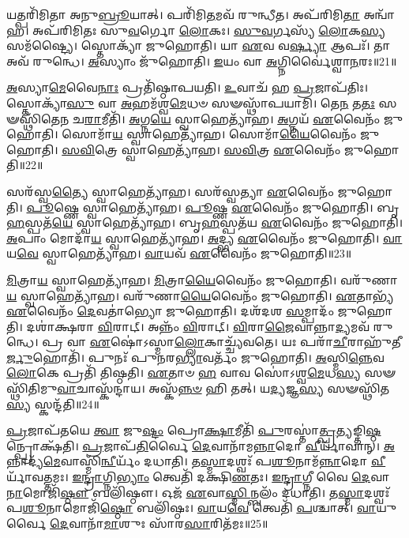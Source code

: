 𑌯𑌤𑍍𑌪𑌰𑌿᳴𑌮𑌿𑌤𑌾 𑌅𑌨𑍁\-\ul{𑌬𑍍𑌰𑍂}\-𑌯𑌾𑌤𑍍।
𑌪𑌰𑌿᳴𑌮𑌿\-\ul{𑌤}\-𑌮𑌵᳴ 𑌰𑍁𑌨𑍍𑌧𑍀𑌤।
𑌅𑌪᳴𑌰𑌿𑌮𑌿\-\ul{𑌤𑌾} 𑌅𑌨𑍍𑌵𑌾᳴𑌹।
𑌅𑌪᳴𑌰𑌿𑌮𑌿𑌤𑌃 𑌸𑍁\-\ul{𑌵}\-𑌰𑍍𑌗𑍋 \ul{𑌲𑍋}\-𑌕𑌃।
\-\ul{𑌸𑍁}\-\-\ul{𑌵}\-𑌰𑍍𑌗𑌸𑍍𑌯᳴ \ul{𑌲𑍋}\-𑌕\-\ul{𑌸𑍍𑌯} 𑌸𑌮᳴𑌷𑍍𑌟𑍍𑌯𑍈।
𑌸𑍍𑌤𑍋𑌕𑍍𑌯𑌾᳴ 𑌜𑍁𑌹𑍋𑌤𑌿।
𑌯𑌾 \ul{𑌏}\-𑌵 𑌵\-\ul{𑌰𑍍𑌷𑍍𑌯𑌾} 𑌆𑌪𑌃᳴।
𑌤𑌾 𑌅𑌵᳴ 𑌰𑍁𑌨𑍍𑌧𑍇।
\-\ul{𑌅}\-𑌸𑍍𑌯𑌾𑌂 𑌜𑍁᳴𑌹𑍋𑌤𑌿।
\-\ul{𑌇}\-𑌯𑌂 𑌵𑌾 \ul{𑌅}\-𑌗𑍍𑌨𑌿𑌰𑍍𑌵𑍈॑𑌶𑍍𑌵𑌾\-\ul{𑌨}\-𑌰𑌃॥21॥

\-\ul{𑌅}\-𑌸𑍍𑌯𑌾\-\ul{𑌮𑍇}\-𑌵𑍈\-\ul{𑌨𑌾𑌃} 𑌪𑍍𑌰𑌤𑌿᳴\-𑌷𑍍𑌠𑌾𑌪𑌯𑌤𑌿।
\-\ul{𑌉}\-𑌵𑌾𑌚᳴ 𑌹 \ul{𑌪𑍍𑌰}\-𑌜𑌾\-𑌪᳴𑌤𑌿𑌃।
𑌸𑍍𑌤𑍋𑌕𑍍𑌯𑌾᳴\-\ul{𑌸𑍁} 𑌵𑌾 \ul{𑌅}\-𑌹𑌮᳴𑌶𑍍𑌵\-\ul{𑌮𑍇}\-𑌧𑍞 𑌸𑍟𑌸𑍍𑌥𑌾᳴𑌪𑌯𑌾𑌮𑌿।
𑌤𑍇\-\ul{𑌨} 𑌤\-\ul{𑌤𑌃} 𑌸𑍟𑌸𑍍𑌥𑌿᳴𑌤𑍇𑌨 𑌚\-\ul{𑌰𑌾}\-𑌮𑍀𑌤𑌿᳴।
\-\ul{𑌅}\-𑌗𑍍𑌨\-\ul{𑌯𑍇} 𑌸𑍍𑌵𑌾𑌹𑍇𑌤𑍍𑌯𑌾᳴𑌹।
\-\ul{𑌅}\-𑌗𑍍𑌨𑌯᳴ \ul{𑌏}\-𑌵𑍈𑌨𑌂᳴ 𑌜𑍁𑌹𑍋𑌤𑌿।
𑌸𑍋𑌮𑌾᳴\-\ul{𑌯} 𑌸𑍍𑌵𑌾𑌹𑍇𑌤𑍍𑌯𑌾᳴𑌹।
𑌸𑍋𑌮𑌾᳴\-\ul{𑌯𑍈}\-𑌵𑍈𑌨𑌂᳴ 𑌜𑍁𑌹𑍋𑌤𑌿।
\-\ul{𑌸}\-\-\ul{𑌵𑌿}\-𑌤𑍍𑌰𑍇 𑌸𑍍𑌵𑌾𑌹𑍇𑌤𑍍𑌯𑌾᳴𑌹।
\-\ul{𑌸}\-\-\ul{𑌵𑌿}\-𑌤𑍍𑌰 \ul{𑌏}\-𑌵𑍈𑌨𑌂᳴ 𑌜𑍁𑌹𑍋𑌤𑌿॥22॥

𑌸𑌰᳴𑌸𑍍𑌵\-\ul{𑌤𑍍𑌯𑍈} 𑌸𑍍𑌵𑌾𑌹𑍇𑌤𑍍𑌯𑌾᳴𑌹।
𑌸𑌰᳴𑌸𑍍𑌵𑌤𑍍𑌯𑌾 \ul{𑌏}\-𑌵𑍈𑌨𑌂᳴ 𑌜𑍁𑌹𑍋𑌤𑌿।
\-\ul{𑌪𑍂}\-𑌷𑍍𑌣𑍇 𑌸𑍍𑌵𑌾𑌹𑍇𑌤𑍍𑌯𑌾᳴𑌹।
\-\ul{𑌪𑍂}\-𑌷𑍍𑌣 \ul{𑌏}\-𑌵𑍈𑌨𑌂᳴ 𑌜𑍁𑌹𑍋𑌤𑌿।
𑌬𑍃\-\ul{𑌹}\-𑌸𑍍𑌪𑌤᳴\-\ul{𑌯𑍇} 𑌸𑍍𑌵𑌾𑌹𑍇𑌤𑍍𑌯𑌾᳴𑌹।
𑌬𑍃\-\ul{𑌹}\-𑌸𑍍𑌪𑌤᳴𑌯 \ul{𑌏}\-𑌵𑍈𑌨𑌂᳴ 𑌜𑍁𑌹𑍋𑌤𑌿।
\-\ul{𑌅}\-𑌪𑌾𑌂 𑌮𑍋𑌦𑌾᳴\-\ul{𑌯} 𑌸𑍍𑌵𑌾𑌹𑍇𑌤𑍍𑌯𑌾᳴𑌹।
\-\ul{𑌅}\-𑌦𑍍𑌭𑍍𑌯 \ul{𑌏}\-𑌵𑍈𑌨𑌂᳴ 𑌜𑍁𑌹𑍋𑌤𑌿।
\-\ul{𑌵𑌾}\-𑌯\-\ul{𑌵𑍇} 𑌸𑍍𑌵𑌾𑌹𑍇𑌤𑍍𑌯𑌾᳴𑌹।
\-\ul{𑌵𑌾}\-𑌯𑌵᳴ \ul{𑌏}\-𑌵𑍈𑌨𑌂᳴ 𑌜𑍁𑌹𑍋𑌤𑌿॥23॥

\-\ul{𑌮𑌿}\-𑌤𑍍𑌰𑌾\-\ul{𑌯} 𑌸𑍍𑌵𑌾𑌹𑍇𑌤𑍍𑌯𑌾᳴𑌹।
\-\ul{𑌮𑌿}\-𑌤𑍍𑌰𑌾\-\ul{𑌯𑍈}\-𑌵𑍈𑌨𑌂᳴ 𑌜𑍁𑌹𑍋𑌤𑌿।
𑌵𑌰𑍁᳴𑌣𑌾\-\ul{𑌯} 𑌸𑍍𑌵𑌾𑌹𑍇𑌤𑍍𑌯𑌾᳴𑌹।
𑌵𑌰𑍁᳴𑌣𑌾\-\ul{𑌯𑍈}\-𑌵𑍈𑌨𑌂᳴ 𑌜𑍁𑌹𑍋𑌤𑌿।
\-\ul{𑌏}\-𑌤𑌾𑌭𑍍𑌯᳴ \ul{𑌏}\-𑌵𑍈𑌨𑌂᳴ \ul{𑌦𑍇}\-𑌵𑌤𑌾॑𑌭𑍍𑌯𑍋 𑌜𑍁𑌹𑍋𑌤𑌿।
𑌦𑌶᳴𑌦𑌶 \ul{𑌸}\-𑌮𑍍𑌪𑌾𑌦𑌂᳴ 𑌜𑍁𑌹𑍋𑌤𑌿।
𑌦𑌶𑌾॑𑌕𑍍𑌷𑌰𑌾 \ul{𑌵𑌿}\-𑌰𑌾𑌟𑍍।
𑌅𑌨𑍍𑌨𑌂᳴ \ul{𑌵𑌿}\-𑌰𑌾𑌟𑍍।
\-\ul{𑌵𑌿}\-𑌰𑌾\-\ul{𑌜𑍈}\-𑌵𑌾𑌨𑍍𑌨𑌾\-\ul{𑌦𑍍𑌯}\-𑌮𑌵᳴ 𑌰𑍁𑌨𑍍𑌧𑍇।
𑌪𑍍𑌰 𑌵𑌾 \ul{𑌏}\-𑌷𑍋॑\-𑌽𑌸𑍍𑌮𑌾\-\ul{𑌲𑍍𑌲𑍋}\-𑌕𑌾𑌚𑍍𑌚𑍍𑌯᳴𑌵𑌤𑍇।
𑌯𑌃 𑌪𑌰𑌾᳴\-\ul{𑌚𑍀}\-𑌰𑌾𑌹𑍁᳴𑌤𑍀\-\ul{𑌰𑍍𑌜𑍁}\-𑌹𑍋𑌤𑌿᳴।
𑌪𑍁𑌨𑌃᳴ 𑌪𑍁𑌨𑌰\-\ul{𑌭𑍍𑌯𑌾}\-𑌵𑌰𑍍𑌤𑌂᳴ 𑌜𑍁𑌹𑍋𑌤𑌿।
\-\ul{𑌅}\-𑌸𑍍𑌮𑌿\-\ul{𑌨𑍍𑌨𑍇}\-𑌵 \ul{𑌲𑍋}\-𑌕𑍇 𑌪𑍍𑌰𑌤𑌿᳴ 𑌤𑌿𑌷𑍍𑌠𑌤𑌿।
\-\ul{𑌏}\-𑌤𑌾𑍞 \ul{𑌹} 𑌵𑌾𑌵 𑌸𑍋॑\-𑌽𑌶𑍍𑌵\-\ul{𑌮𑍇}\-𑌧\-\ul{𑌸𑍍𑌯} 𑌸𑍟𑌸𑍍𑌥𑌿᳴𑌤𑌿𑌮𑍁\-\ul{𑌵𑌾}\-𑌚𑌾𑌸𑍍𑌕᳴𑌨𑍍𑌦𑌾𑌯।
𑌅𑌸𑍍𑌕᳴\-\ul{𑌨𑍍𑌨}\-\-\ul{𑍞} 𑌹𑌿 𑌤𑌤𑍍।
𑌯\-\ul{𑌦𑍍𑌯}\-𑌜𑍍𑌞\-\ul{𑌸𑍍𑌯} 𑌸𑍟𑌸𑍍𑌥𑌿᳴𑌤\-\ul{𑌸𑍍𑌯} 𑌸𑍍𑌕𑌨𑍍𑌦᳴𑌤𑌿॥24॥\anuvakamend[\-\ul{𑌅}\-𑌭𑌿𑌜𑌿᳴𑌤𑍍𑌯𑍈 𑌵𑍈𑌶𑍍𑌵𑌾\-\ul{𑌨}\-𑌰𑌃 𑌸᳴\-\ul{𑌵𑌿}\-𑌤𑍍𑌰 \ul{𑌏}\-𑌵𑍈𑌨𑌂᳴ 𑌜𑍁𑌹𑍋𑌤𑌿 \ul{𑌵𑌾}\-𑌯𑌵᳴ \ul{𑌏}\-𑌵𑍈𑌨𑌂᳴ 𑌜𑍁𑌹𑍋𑌤𑌿 𑌚𑍍𑌯𑌵\-\ul{𑌤𑍇} 𑌷𑌟𑍍 𑌚᳴]

\-\ul{𑌪𑍍𑌰}\-𑌜𑌾𑌪᳴𑌤𑌯𑍇 \ul{𑌤𑍍𑌵𑌾} 𑌜𑍁\-\ul{𑌷𑍍𑌟𑌂} 𑌪𑍍𑌰𑍋\-\ul{𑌕𑍍𑌷𑌾}\-𑌮𑍀𑌤𑌿᳴ \ul{𑌪𑍁}\-𑌰𑌸𑍍𑌤𑌾॑\-\ul{𑌤𑍍𑌪𑍍𑌰}\-𑌤𑍍𑌯𑌙𑍍𑌤𑌿\-\ul{𑌷𑍍𑌠}\-𑌨𑍍𑌪𑍍𑌰𑍋𑌕𑍍𑌷᳴𑌤𑌿।
\-\ul{𑌪𑍍𑌰}\-𑌜𑌾𑌪᳴\-\ul{𑌤𑌿}\-𑌰𑍍𑌵𑍈 \ul{𑌦𑍇}\-𑌵𑌾𑌨𑌾᳴𑌮\-\ul{𑌨𑍍𑌨𑌾}\-𑌦𑍋 \ul{𑌵𑍀}\-𑌰𑍍𑌯𑌾᳴𑌵𑌾𑌨𑍍।
\-\ul{𑌅}\-𑌨𑍍𑌨𑌾𑌦𑍍𑌯᳴\-\ul{𑌮𑍇}\-𑌵𑌾𑌸𑍍𑌮𑌿᳴\-\ul{𑌨𑍍𑌵𑍀}\-𑌰𑍍𑌯𑌂᳴ 𑌦𑌧𑌾𑌤𑌿।
𑌤\-\ul{𑌸𑍍𑌮𑌾}\-𑌦𑌶𑍍𑌵𑌃᳴ 𑌪\-\ul{𑌶𑍂}\-𑌨𑌾𑌮᳴\-\ul{𑌨𑍍𑌨𑌾}\-𑌦𑍋 \ul{𑌵𑍀}\-𑌰𑍍𑌯𑌾᳴𑌵𑌤𑍍𑌤𑌮𑌃।
\-\ul{𑌇}\-\-\ul{𑌨𑍍𑌦𑍍𑌰𑌾}\-𑌗𑍍𑌨𑌿\-\ul{𑌭𑍍𑌯𑌾𑌂} 𑌤𑍍𑌵𑍇𑌤𑌿᳴ 𑌦𑌕𑍍𑌷𑌿\-\ul{𑌣}\-𑌤𑌃।
\-\ul{𑌇}\-\-\ul{𑌨𑍍𑌦𑍍𑌰𑌾}\-𑌗𑍍𑌨𑍀 𑌵𑍈 \ul{𑌦𑍇}\-𑌵𑌾\-\ul{𑌨𑌾}\-𑌮𑍋𑌜𑌿᳴\-\ul{𑌷𑍍𑌠𑍗} 𑌬𑌲𑌿᳴𑌷𑍍𑌠𑍗।
𑌓𑌜᳴ \ul{𑌏}\-𑌵𑌾\-\ul{𑌸𑍍𑌮𑌿}\-𑌨𑍍𑌬𑌲𑌂᳴ 𑌦𑌧𑌾𑌤𑌿।
𑌤\-\ul{𑌸𑍍𑌮𑌾}\-𑌦𑌶𑍍𑌵𑌃᳴ 𑌪\-\ul{𑌶𑍂}\-𑌨𑌾𑌮𑍋𑌜𑌿᳴\-\ul{𑌷𑍍𑌠𑍋} 𑌬𑌲𑌿᳴𑌷𑍍𑌠𑌃।
\-\ul{𑌵𑌾}\-𑌯\-\ul{𑌵𑍇} 𑌤𑍍𑌵𑍇𑌤𑌿᳴ \ul{𑌪}\-𑌶𑍍𑌚𑌾𑌤𑍍।
\-\ul{𑌵𑌾}\-𑌯𑍁𑌰𑍍𑌵𑍈 \ul{𑌦𑍇}\-𑌵𑌾𑌨𑌾᳴\-\ul{𑌮𑌾}\-𑌶𑍁𑌃 𑌸𑌾᳴𑌰\-\ul{𑌸𑌾}\-𑌰𑌿𑌤᳴𑌮𑌃॥25॥

